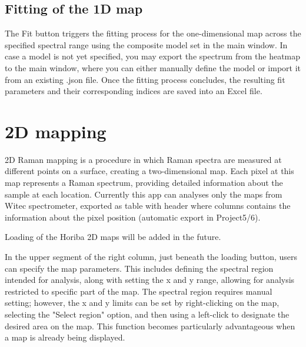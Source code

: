 \subsection{Fitting of the 1D map}
The Fit button triggers the fitting process for the one-dimensional map across the specified spectral range using the composite model set in the main window. In case a model is not yet specified, you may export the spectrum from the heatmap to the main window, where you can either manually define the model or import it from an existing .json file. Once the fitting process concludes, the resulting fit parameters and their corresponding indices are saved into an Excel file.
\section{2D mapping}
2D Raman mapping is a procedure in which Raman spectra are measured at different points on a surface, creating a two-dimensional map. Each pixel at this map represents a Raman spectrum, providing detailed information about the sample at each location.
Currently this app can analyses only the maps from Witec spectrometer, exported as table with header where columns contains the information about the pixel position (automatic export in Project5/6).

Loading of the Horiba 2D maps will be added in the future.

In the upper segment of the right column, just beneath the loading button, users can specify the map parameters. This includes defining the spectral region intended for analysis, along with setting the x and y range, allowing for analysis restricted to specific part of the map. The spectral region requires manual setting; however, the x and y limits can be set by right-clicking on the map, selecting the "Select region" option, and then using a left-click to designate the desired area on the map. This function becomes particularly advantageous when a map is already being displayed.

